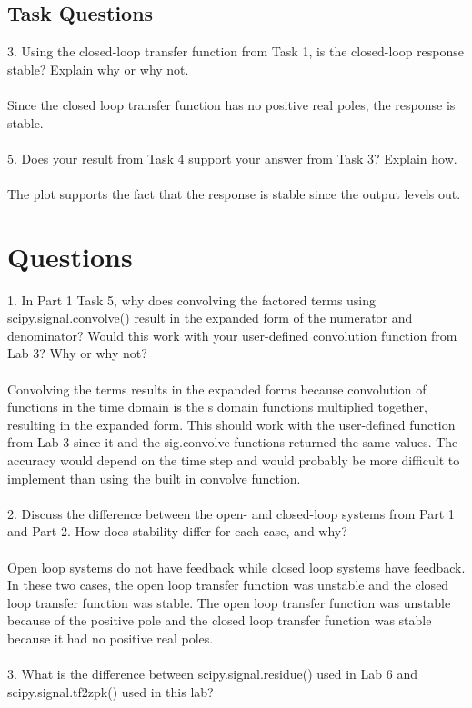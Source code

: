 \subsection{Task Questions}
3. Using the closed-loop transfer function from Task 1, is the closed-loop response stable?  Explain why or why not. 
\\ \\
Since the closed loop transfer function has no positive real poles, the response is stable.
\\ \\ 
5. Does your result from Task 4 support your answer from Task 3?  Explain how.
\\ \\
The plot supports the fact that the response is stable since the output levels out.


\section{Questions}
1. In Part 1 Task 5, why does convolving the factored terms using scipy.signal.convolve() result in the expanded form of the numerator and denominator? Would this work with your user-defined convolution function from Lab 3? Why or why not?
\\ \\
Convolving the terms results in the expanded forms because convolution of functions in the time domain is the s domain functions multiplied together, resulting in the expanded form.  This should work with the user-defined function from Lab 3 since it and the sig.convolve functions returned the same values.  The accuracy would depend on the time step and would probably be more difficult to implement than using the built in convolve function.
\\ \\
2. Discuss the difference between the open- and closed-loop systems from Part 1 and Part 2. How does stability differ for each case, and why?
\\ \\
Open loop systems do not have feedback while closed loop systems have feedback.  In these two cases, the open loop transfer function was unstable and the closed loop transfer function was stable.  The open loop transfer function was unstable because of the positive pole and the closed loop transfer function was stable because it had no positive real poles.
\\ \\
3. What is the difference between scipy.signal.residue() used in Lab 6 and scipy.signal.tf2zpk() used in this lab?
